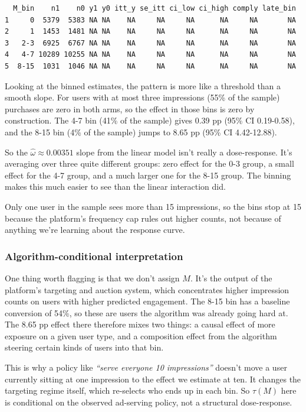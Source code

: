 \begin{verbatim}
  M_bin    n1    n0 y1 y0 itt_y se_itt ci_low ci_high comply late_bin
1     0  5379  5383 NA NA    NA     NA     NA      NA     NA       NA
2     1  1453  1481 NA NA    NA     NA     NA      NA     NA       NA
3   2-3  6925  6767 NA NA    NA     NA     NA      NA     NA       NA
4   4-7 10289 10255 NA NA    NA     NA     NA      NA     NA       NA
5  8-15  1031  1046 NA NA    NA     NA     NA      NA     NA       NA
\end{verbatim}

Looking at the binned estimates, the pattern is more like a threshold
than a smooth slope. For users with at most three impressions (55\% of
the sample) purchases are zero in both arms, so the effect in those bins
is zero by construction. The 4-7 bin (41\% of the sample) gives 0.39 pp
(95\% CI 0.19-0.58), and the 8-15 bin (4\% of the sample) jumps to 8.65
pp (95\% CI 4.42-12.88).

So the \(\hat\omega \approx 0.00351\) slope from the linear model isn't
really a dose-response. It's averaging over three quite different
groups: zero effect for the 0-3 group, a small effect for the 4-7 group,
and a much larger one for the 8-15 group. The binning makes this much
easier to see than the linear interaction did.

Only one user in the sample sees more than 15 impressions, so the bins
stop at 15 because the platform's frequency cap rules out higher counts,
not because of anything we're learning about the response curve.

\subsubsection{Algorithm-conditional interpretation}

One thing worth flagging is that we don't assign \(M\). It's the output
of the platform's targeting and auction system, which concentrates
higher impression counts on users with higher predicted engagement. The
8-15 bin has a baseline conversion of 54\%, so these are users the
algorithm was already going hard at. The 8.65 pp effect there therefore
mixes two things: a causal effect of more exposure on a given user type,
and a composition effect from the algorithm steering certain kinds of
users into that bin.

This is why a policy like \emph{``serve everyone 10 impressions''}
doesn't move a user currently sitting at one impression to the effect we
estimate at ten. It changes the targeting regime itself, which
re-selects who ends up in each bin. So \(\tau(M)\) here is conditional
on the observed ad-serving policy, not a structural dose-response.

